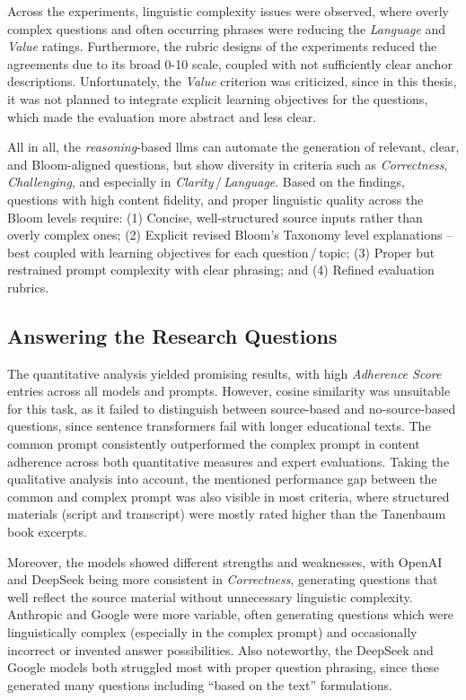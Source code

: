 Across the experiments, linguistic complexity issues were observed, where overly complex questions and often occurring phrases were reducing the \textit{Language} and \textit{Value} ratings. Furthermore, the rubric designs of the experiments reduced the agreements due to its broad 0-10 scale, coupled with not sufficiently clear anchor descriptions. Unfortunately, the \textit{Value} criterion was criticized, since in this thesis, it was not planned to integrate explicit learning objectives for the questions, which made the evaluation more abstract and less clear.

All in all, the \textit{reasoning}-based \acp{llm} can automate the generation of relevant, clear, and Bloom-aligned questions, but show diversity in criteria such as \textit{Correctness}, \textit{Challenging}, and especially in \textit{Clarity}\,/\,\textit{Language}. Based on the findings, questions with high content fidelity, and proper linguistic quality across the Bloom levels require: (1) Concise, well-structured source inputs rather than overly complex ones; (2) Explicit revised Bloom's Taxonomy level explanations -- best coupled with learning objectives for each question\,/\,topic; (3) Proper but restrained prompt complexity with clear phrasing; and (4) Refined evaluation rubrics.

\subsection{Answering the Research Questions}


The quantitative analysis yielded promising results, with high \textit{Adherence Score} entries across all models and prompts. However, cosine similarity was unsuitable for this task, as it failed to distinguish between source-based and no-source-based questions, since sentence transformers fail with longer educational texts. The common prompt consistently outperformed the complex prompt in content adherence across both quantitative measures and expert evaluations. Taking the qualitative analysis into account, the mentioned performance gap between the common and complex prompt was also visible in most criteria, where structured materials (script and transcript) were mostly rated higher than the Tanenbaum book excerpts.

Moreover, the models showed different strengths and weaknesses, with OpenAI and DeepSeek being more consistent in \textit{Correctness}, generating questions that well reflect the source material without unnecessary linguistic complexity. Anthropic and Google were more variable, often generating questions which were linguistically complex (especially in the complex prompt) and occasionally incorrect or invented answer possibilities. Also noteworthy, the DeepSeek and Google models both struggled most with proper question phrasing, since these generated many questions including \enquote{based on the text} formulations. 

